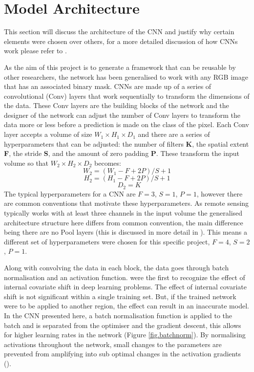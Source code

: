 \section{Model Architecture}\label{sec.model_architecture}
This section will discuss the architecture of the CNN and justify why certain elements were chosen over others, for a more detailed discussion of how CNNs work please refer to \cite{Richmond19b}.
\par
As the aim of this project is to generate a framework that can be reusable by other researchers, the network has been generalised to work with any RGB image that has an associated binary mask. CNNs are made up of a series of convolutional (Conv) layers that work sequentially to transform the dimensions of the data. These Conv layers are the building blocks of the network and the designer of the network can adjust the number of Conv layers to transform the data more or less before a prediction is made on the class of the pixel. Each Conv layer accepts a volume of size\textbf{ $W_1\times H_1\times D_1$} and there are a series of hyperparameters that can be adjusted: the number of filters \textbf{K}, the spatial extent \textbf{F}, the stride \textbf{S}, and the amount of zero padding \textbf{P}. These transform the input volume so that \textbf{$W_2\times H_2\times D_2$} becomes: 
\[\textbf{$W_2 = (W_1 - F + 2P)/S + 1$}\] \[\textbf{$H_2 = (H_1 - F + 2P)/S + 1$}\]\[\textbf{ $D_2 = K$}\]
The typical hyperparameters for a CNN are $F = 3$, $S = 1$, $P = 1$, however there are common conventions that motivate these hyperparameters. As remote sensing typically works with at least three channels in the input volume the generalised architecture structure here differs from common convention, the main difference being there are no Pool layers (this is discussed in more detail in \citet{Richmond19b}). This means a different set of hyperparameters were chosen for this specific project, $F = 4$, $S = 2$, $P = 1$. 
\par
Along with convolving the data in each block, the data goes through batch normalisation and an activation function. \citet{ioffe15} were the first to recognize the effect of internal covariate shift in deep learning problems. The effect of internal covariate shift is not significant within a single training set. But, if the trained network were to be applied to another region, the effect can result in an inaccurate model. In the CNN presented here, a batch normalisation function is applied to the batch and is separated from the optimiser and the gradient descent, this allows for higher learning rates in the network (Figure \ref{fig.batchnorm}). By normalising activations throughout the network, small changes to the parameters are prevented from amplifying into sub optimal changes in the activation gradients (\cite{ioffe15}). 

